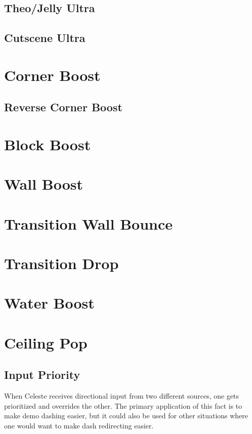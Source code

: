 \documentclass[oneside]{book}
\begin{document}
\subsection{Theo/Jelly Ultra}

\subsection{Cutscene Ultra}

\section{Corner Boost}

\subsection{Reverse Corner Boost}

\section{Block Boost}

\section{Wall Boost}

\section{Transition Wall Bounce}

\section{Transition Drop}

\section{Water Boost}

\section{Ceiling Pop}

\subsection{Input Priority}

When Celeste receives directional input from two different sources, one gets prioritized and overrides the other. The primary application of this fact is to make demo dashing easier, but it could also be used for other situations where one would want to make dash redirecting easier.
\end{document}
